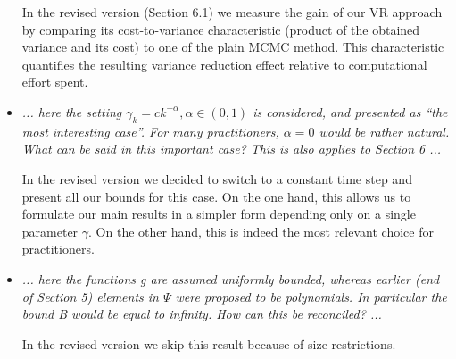 \documentclass{article}%
\begin{document}
\begin{itemize}
\par
In the revised version (Section 6.1) we measure the gain of our VR approach by comparing its cost-to-variance characteristic (product of the obtained variance and its cost) to one of the plain MCMC method. This characteristic quantifies  the resulting variance reduction effect relative to computational effort spent. 
\item \textit{... here the setting \(\gamma_k = c k^{-\alpha}, \alpha\in  (0, 1)\) is considered, and presented as  ``the most interesting case''. For many practitioners, $\alpha=0$ would be rather natural. What can be said in this important case? This is also applies to Section 6 ...}
\par
In the revised version we decided to switch to  a constant time step and present all our bounds for this case. On the one hand, this allows us to formulate our main results in a simpler form depending only on a single parameter $\gamma.$ On the other hand, this is indeed the most relevant choice for practitioners.  
\item \textit{ ... here the functions g are assumed uniformly bounded, whereas earlier (end of Section 5) elements in $\Psi$ were proposed to be polynomials. In particular the bound B would be equal to infinity. How can this be reconciled? ...}
\par
In the revised version we skip this result because of size restrictions. 
\end{itemize}
\end{document}
